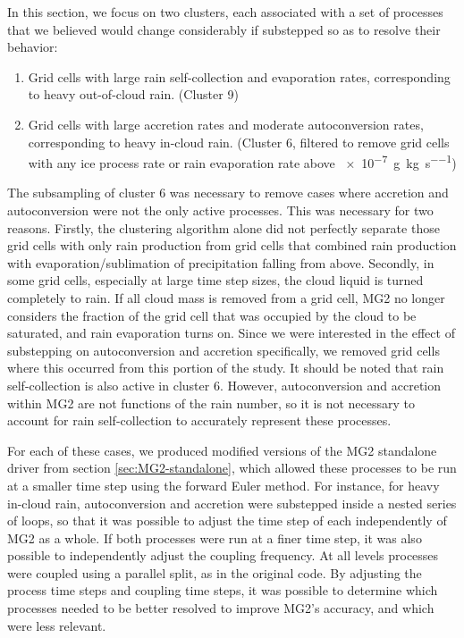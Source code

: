 \documentclass [11pt, proquest] {uwthesis}[2020/02/24]
\begin{document}
In this section, we focus on two clusters, each associated with a set of processes that we believed would change considerably if substepped so as to resolve their behavior:

\begin{enumerate}
\item Grid cells with large rain self-collection and evaporation rates, corresponding to heavy out-of-cloud rain. (Cluster 9)
\item Grid cells with large accretion rates and moderate autoconversion rates, corresponding to heavy in-cloud rain. (Cluster 6, filtered to remove grid cells with any ice process rate or rain evaporation rate above \SI{e-7}{\gram\per\kilo\gram\per\second})
\end{enumerate}

The subsampling of cluster 6 was necessary to remove cases where accretion and autoconversion were not the only active processes. This was necessary for two reasons. Firstly, the clustering algorithm alone did not perfectly separate those grid cells with only rain production from grid cells that combined rain production with evaporation/sublimation of precipitation falling from above. Secondly, in some grid cells, especially at large time step sizes, the cloud liquid is turned completely to rain. If all cloud mass is removed from a grid cell, MG2 no longer considers the fraction of the grid cell that was occupied by the cloud to be saturated, and rain evaporation turns on. Since we were interested in the effect of substepping on autoconversion and accretion specifically, we removed grid cells where this occurred from this portion of the study. It should be noted that rain self-collection is also active in cluster 6. However, autoconversion and accretion within MG2 are not functions of the rain number, so it is not necessary to account for rain self-collection to accurately represent these processes.

For each of these cases, we produced modified versions of the MG2 standalone driver from section \ref{sec:MG2-standalone}, which allowed these processes to be run at a smaller time step using the forward Euler method. For instance, for heavy in-cloud rain, autoconversion and accretion were substepped inside a nested series of loops, so that it was possible to adjust the time step of each independently of MG2 as a whole. If both processes were run at a finer time step, it was also possible to independently adjust the coupling frequency. At all levels processes were coupled using a parallel split, as in the original code. By adjusting the process time steps and coupling time steps, it was possible to determine which processes needed to be better resolved to improve MG2's accuracy, and which were less relevant.
\end{document}
